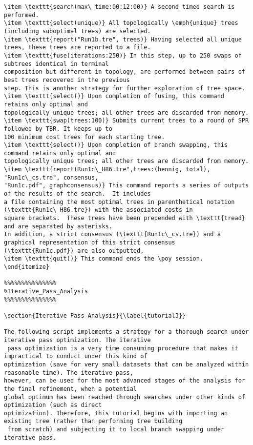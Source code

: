 \begin{verbatim}
\item \texttt{search(max\_time:00:12:00)} A second timed search is performed.  
\item \texttt{select(unique)} All topologically \emph{unique} trees (including suboptimal trees) are selected.
\item \texttt{report("Run1b.tre", trees)} Having selected all unique trees, these trees are reported to a file.  
\item \texttt{fuse(iterations:250)} In this step, up to 250 swaps of subtrees identical in terminal 
composition but different in topology, are performed between pairs of best trees recovered in the previous 
step. This is another strategy for further exploration of tree space.
\item \texttt{select()} Upon completion of fusing, this command retains only optimal and 
topologically unique trees; all other trees are discarded from memory.
\item \texttt{swap(trees:100)} Submits current trees to a round of SPR followed by TBR. It keeps up to 
100 minimum cost trees for each starting tree.
\item \texttt{select()} Upon completion of branch swapping, this command retains only optimal and 
topologically unique trees; all other trees are discarded from memory.
\item \texttt{report(Run1c\_H86.tre",trees:(hennig, total), "Run1c\_cs.tre", consensus,
"Run1c.pdf", graphconsensus)} This command reports a series of outputs of the results of the search.  It includes 
a file containing the most optimal trees in parenthetical notation (\texttt{Run1c\_H86.tre}) with the associated costs in 
square brackets.  These trees have been prepended with \texttt{tread} and are separated by asterisks. 
In addition, a strict consensus (\texttt{Run1c\_cs.tre}) and a graphical representation of this strict consensus
(\texttt{Run1c.pdf}) are also outputted.
\item \texttt{quit()} This command ends the \poy session.
\end{itemize}

%%%%%%%%%%%%%%%
%Iterative_Pass_Analysis
%%%%%%%%%%%%%%%

\section{Iterative Pass Analysis}{\label{tutorial3}}

The following script implements a strategy for a thorough search under iterative pass optimization. The iterative
 pass optimization is a very time consuming procedure that makes it impractical to conduct under this kind of 
optimization (save for very small datasets that can be analyzed within reasonable time). The iterative pass, 
however, can be used for the most advanced stages of the analysis for the final refinement, when a potential 
global optimum has been reached through searches under other kinds of optimization (such as direct 
optimization). Therefore, this tutorial begins with importing an existing tree (rather than performing tree building
 from scratch) and subjecting it to local branch swapping under iterative pass.


\end{verbatim}
